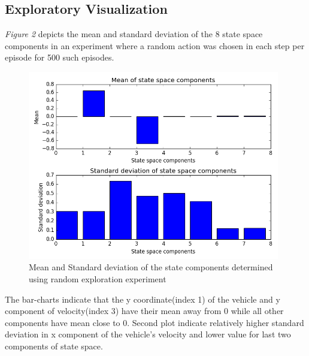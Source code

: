 \documentclass{article}
\begin{document}
\subsection*{Exploratory Visualization}
\textit{Figure 2} depicts the mean and standard deviation of the 8 state space components in an experiment where a random action was chosen in each step per episode for 500 such episodes.\\
\begin{figure}[H]
	\caption{Mean and Standard deviation of the state components determined using random exploration experiment}
	\centering
	\includegraphics[width=11cm]{img/state-space}
\end{figure}
The bar-charts indicate that the y coordinate(index 1) of the vehicle and y component of velocity(index 3) have their mean away from 0 while all other components have mean close to 0. Second plot indicate relatively higher standard deviation in x component of the vehicle's velocity and lower value for last two components of state space.
\end{document}

